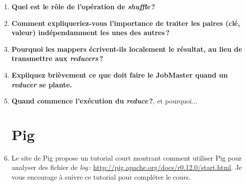 \documentclass{article}
\begin{document}
\begin{enumerate}
  \item \textbf{Quel est le rôle de l'opération de  \textit{shuffle}\,?}

  \vspace*{4cm}
  
  \item \textbf{Comment expliqueriez-vous l'importance de traiter les paires (clé, valeur) indépendamment les unes des autres\,?}

  \vspace*{4cm}

  \item \textbf{Pourquoi les mappers écrivent-ils localement le résultat, au lieu de transmettre aux \textit{reducers}\,?}

  \vspace*{4cm}
    
 \item \textbf{Expliquez brièvement ce que doit faire le JobMaster quand un \textit{reducer} se plante.}

  \vspace*{4cm}

\item \textbf{Quand commence l'exécution du \textit{reduce}\,?}, et pourquoi...

\section{Pig}

\item Le site de Pig propose un tutorial court montrant comment utiliser Pig pour analyser des fichier de \textit{log}\,:
    \url{http://pig.apache.org/docs/r0.12.0/start.html}. Je vous encourage à suivre ce tutorial pour compléter le cours. 
    
    \end{enumerate}
\end{document}
